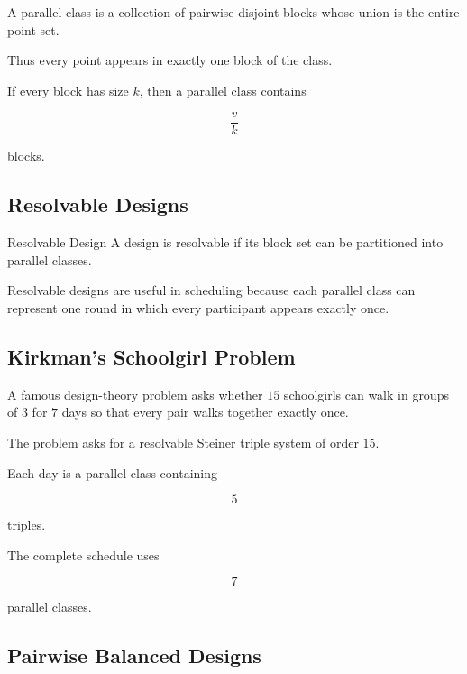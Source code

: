 A parallel class is a collection of pairwise disjoint blocks whose
union is the entire point set.

Thus every point appears in exactly one block of the class.

If every block has size \(k\), then a parallel class contains

\[
\boxed{
\frac{v}{k}
}
\]

blocks.

\subsection{Resolvable Designs}
\label{subsec:resolvable-designs}

\begin{definitionbox}{Resolvable Design}
A design is resolvable if its block set can be partitioned into parallel
classes.
\end{definitionbox}

Resolvable designs are useful in scheduling because each parallel class
can represent one round in which every participant appears exactly
once.

\subsection{Kirkman's Schoolgirl Problem}
\label{subsec:kirkman-schoolgirl}

A famous design-theory problem asks whether \(15\) schoolgirls can walk
in groups of \(3\) for \(7\) days so that every pair walks together
exactly once.

The problem asks for a resolvable Steiner triple system of order \(15\).

Each day is a parallel class containing

\[
5
\]

triples.

The complete schedule uses

\[
7
\]

parallel classes.

\subsection{Pairwise Balanced Designs}
\label{subsec:pairwise-balanced-designs}

